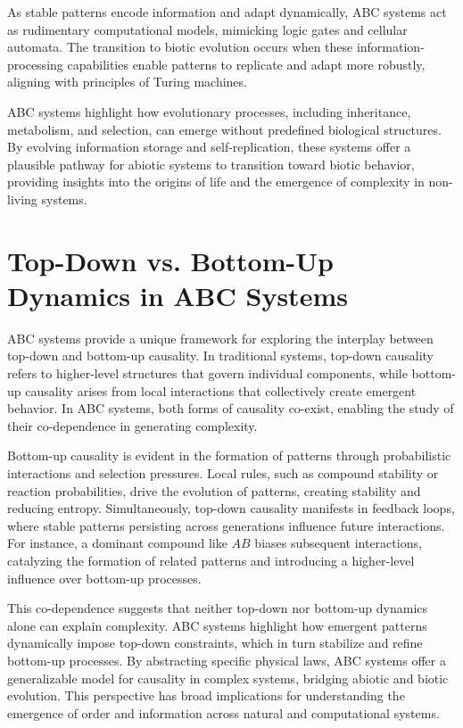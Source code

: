\documentclass[entropy,article,submit,pdftex,moreauthors]{Definitions/mdpi}
\begin{document}
As stable patterns encode information and adapt dynamically, ABC systems act as rudimentary computational models, mimicking logic gates and cellular automata. The transition to biotic evolution occurs when these information-processing capabilities enable patterns to replicate and adapt more robustly, aligning with principles of Turing machines.

ABC systems highlight how evolutionary processes, including inheritance, metabolism, and selection, can emerge without predefined biological structures. By evolving information storage and self-replication, these systems offer a plausible pathway for abiotic systems to transition toward biotic behavior, providing insights into the origins of life and the emergence of complexity in non-living systems.


\section{Top-Down vs. Bottom-Up Dynamics in ABC Systems}

ABC systems provide a unique framework for exploring the interplay between top-down and bottom-up causality. In traditional systems, top-down causality refers to higher-level structures that govern individual components, while bottom-up causality arises from local interactions that collectively create emergent behavior. In ABC systems, both forms of causality co-exist, enabling the study of their co-dependence in generating complexity.

Bottom-up causality is evident in the formation of patterns through probabilistic interactions and selection pressures. Local rules, such as compound stability or reaction probabilities, drive the evolution of patterns, creating stability and reducing entropy. Simultaneously, top-down causality manifests in feedback loops, where stable patterns persisting across generations influence future interactions. For instance, a dominant compound like \( AB \) biases subsequent interactions, catalyzing the formation of related patterns and introducing a higher-level influence over bottom-up processes.

This co-dependence suggests that neither top-down nor bottom-up dynamics alone can explain complexity. ABC systems highlight how emergent patterns dynamically impose top-down constraints, which in turn stabilize and refine bottom-up processes. By abstracting specific physical laws, ABC systems offer a generalizable model for causality in complex systems, bridging abiotic and biotic evolution. This perspective has broad implications for understanding the emergence of order and information across natural and computational systems.
\end{document}
